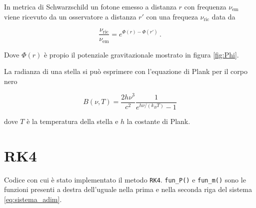 \documentclass[a4paper, titlepage]{article}
\newcommand{\Sh}[0]{Schwarzschild }
\begin{document}
In metrica di \Sh un fotone emesso a distanza $r$ con frequenza $\nu_\text{em}$ viene ricevuto da un osservatore a distanza $r'$ con una frequeza $\nu_\text{ric}$ data da

\begin{equation}
    \frac{\nu_\text{ric}}{\nu_\text{em}} = e^{\Phi (r) - \Phi (r')} \, .
\label{eq:redshift}
\end{equation}

Dove $\Phi (r)$ è propio il potenziale gravitazionale mostrato in figura \ref{fig:Phi}.

La radianza di una stella si può esprimere con l'equazione di Plank per il corpo nero

\begin{equation}
    B(\nu, T) = \frac{2 h \nu ^3}{c^2} \frac{1}{e^{h \nu / (k_B T)} - 1}
    \label{eq:rad}
\end{equation}

dove $T$ è la temperatura della stella e $h$ la costante di Plank.






















\newpage
\appendix

\section{RK4} \label{ap:RK4}
Codice con cui è stato implementato il metodo \texttt{RK4}. \texttt{fun\_P()} e \texttt{fun\_m()} sono le funzioni presenti a destra dell'uguale nella prima e nella seconda riga del sistema \ref{eq:sistema_adim}.
\end{document}
